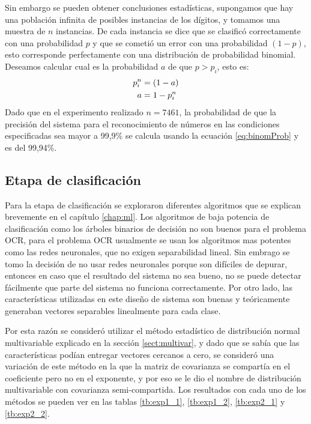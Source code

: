 \documentclass[a4paper, 11pt, oneside]{report}
\begin{document}
Sin embargo se pueden obtener conclusiones estadísticas, supongamos que hay una población infinita de posibles instancias de los dígitos, y tomamos una muestra de $n$ instancias. De cada instancia se dice que se clasificó correctamente con una probabilidad $p$ y que se cometió un error con una probabilidad $(1-p)$, esto corresponde perfectamente con una distribución de probabilidad binomial. Deseamos calcular cual es la probabilidad $a$ de que $p>p_i$, esto es:
\begin{align}
	p_i^n &= (1-a) \notag \\
	a &= 1-p_i^n \label{eq:binomProb}
\end{align}
Dado que en el experimento realizado $n=7461$, la probabilidad de que la precisión del sistema para el reconocimiento de números en las condiciones especificadas sea mayor a 99,9\% se calcula usando la ecuación \ref{eq:binomProb} y es del 99,94\%.

\subsection{Etapa de clasificación}
Para la etapa de clasificación se exploraron diferentes algoritmos que se explican brevemente en el capítulo \ref{chap:ml}. Los algoritmos de baja potencia de clasificación como los árboles binarios de decisión no son buenos para el problema OCR, para el problema OCR usualmente se usan los algoritmos mas potentes como las redes neuronales, que no exigen separabilidad lineal. Sin embrago se tomo la decisión de no usar redes neuronales porque son difíciles de depurar, entonces en caso que el resultado del sistema no sea bueno, no se puede detectar fácilmente que parte del sistema no funciona correctamente. Por otro lado, las características utilizadas en este diseño de sistema son buenas y teóricamente generaban vectores separables linealmente para cada clase.

Por esta razón se consideró utilizar el método estadístico de distribución normal multivariable explicado en la sección \ref{sect:multivar}, y dado que se sabía que las características podían entregar vectores cercanos a cero, se consideró una variación de este método en la que la matriz de covarianza se compartía en el coeficiente pero no en el exponente, y por eso se le dio el nombre de distribución multivariable con covarianza semi-compartida. Los resultados con cada uno de los métodos se pueden ver en las tablas \ref{tb:exp1_1}, \ref{tb:exp1_2}, \ref{tb:exp2_1} y \ref{tb:exp2_2}.
\end{document}
